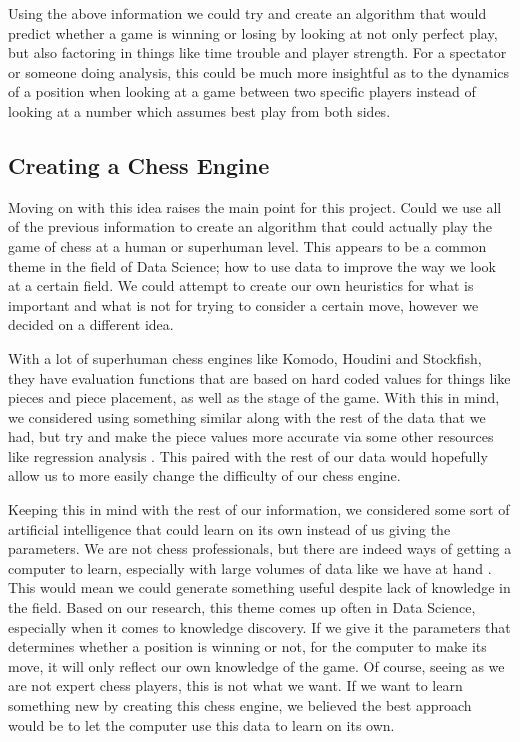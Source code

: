 \documentclass[12pt]{article}
\begin{document}
    Using the above information we could try and create an algorithm that would predict whether a game is winning or losing by looking at not only perfect play, but also factoring in things like time trouble and player strength. For a spectator or someone doing analysis, this could be much more insightful as to the dynamics of a position when looking at a game between two specific players instead of looking at a number which assumes best play from both sides.

    \subsection{Creating a Chess Engine}

    Moving on with this idea raises the main point for this project. Could we use all of the previous information to create an algorithm that could actually play the game of chess at a human or superhuman level. This appears to be a common theme in the field of Data Science; how to use data to improve the way we look at a certain field. We could attempt to create our own heuristics for what is important and what is not for trying to consider a certain move, however we decided on a different idea. 

    With a lot of superhuman chess engines like Komodo, Houdini and Stockfish, they have evaluation functions that are based on hard coded values for things like pieces and piece placement, as well as the stage of the game. With this in mind, we considered using something similar along with the rest of the data that we had, but try and make the piece values more accurate via some other resources like regression analysis \cite{piece_values}. This paired with the rest of our data would hopefully allow us to more easily change the difficulty of our chess engine. 

    Keeping this in mind with the rest of our information, we considered some sort of artificial intelligence that could learn on its own instead of us giving the parameters. We are not chess professionals, but there are indeed ways of getting a computer to learn, especially with large volumes of data like we have at hand \cite{mltypes_book}\cite{mlbook}. This would mean we could generate something useful despite lack of knowledge in the field. Based on our research, this theme comes up often in Data Science, especially when it comes to knowledge discovery. If we give it the parameters that determines whether a position is winning or not, for the computer to make its move, it will only reflect our own knowledge of the game. Of course, seeing as we are not expert chess players, this is not what we want. If we want to learn something new by creating this chess engine, we believed the best approach would be to let the computer use this data to learn on its own.
\end{document}
